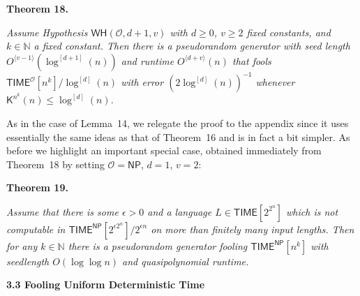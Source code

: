 \documentclass[10pt,a4paper]{article}
\begin{document}


\par\medskip\noindent\textbf{
\textbf{Theorem 18}\textbf{.}
}\par



\emph{Assume Hypothesis $\mathsf{WH}(\mathcal{O},d+1,v)$ with $d\geq 0$, $v\geq 2$ fixed constants, and $k\in\mathbb{N}$ a fixed constant. Then there is a pseudorandom generator with seed length $O^{\langle v-1\rangle}(\log^{[d+1]}(n))$ and runtime $O^{\langle d+v\rangle}(n)$ that fools ${\mathsf{TIME}}^{\mathcal{O}}[n^{k}]/\log^{[d]}(n)$ with error $(2\log^{[d]}(n))^{-1}$ whenever ${\mathsf{K}}^{n^{k}}(n)\leq\log^{[d]}(n)$.}\par






As in the case of Lemma 14, we relegate the proof to the appendix since it uses essentially the same ideas as that of Theorem 16 and is in fact a bit simpler. As before we highlight an important special case, obtained immediately from Theorem 18 by setting $\mathcal{O}={\mathsf{NP}}$, $d=1$, $v=2$:\par





\par\medskip\noindent\textbf{
\textbf{Theorem 19}\textbf{.}
}\par



\emph{Assume that there is some $\epsilon>0$ and a language $L\in{\mathsf{TIME}}[2^{2^{n}}]$ which is not computable in ${\mathsf{TIME}}^{\mathsf{NP}}[2^{\epsilon 2^{n}}]/2^{\epsilon n}$ on more than finitely many input lengths. Then for any $k\in\mathbb{N}$ there is a pseudorandom generator fooling ${\mathsf{TIME}}^{\mathsf{NP}}[n^{k}]$ with seedlength $O(\log\log n)$ and quasipolynomial runtime.}\par








\par\medskip\noindent\textbf{
3.3 Fooling Uniform Deterministic Time }\par
\end{document}
